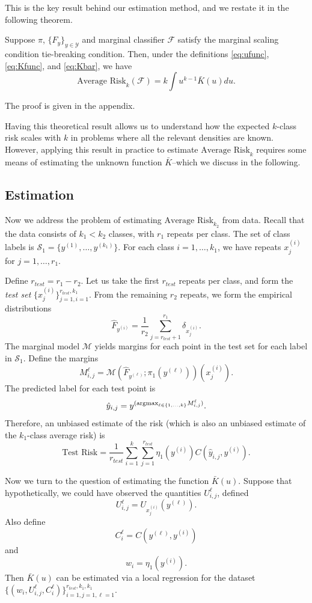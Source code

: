\documentclass[12pt]{article}
\begin{document}
This is the key result behind our estimation method, and we restate it
in the following theorem.

\begin{theorem}
Suppose $\pi$, $\{F_y\}_{y \in \mathcal{Y}}$ and marginal classifier
$\mathcal{F}$ satisfy the marginal scaling condition tie-breaking
condition.  Then, under the definitions \eqref{eq:ufunc}, \eqref{eq:Kfunc}, and \eqref{eq:Kbar}, we have
\[
\text{Average Risk}_k(\mathcal{F}) = k \int u^{k-1} \bar{K}(u) du.
\]
\end{theorem}

The proof is given in the appendix.

Having this theoretical result allows us to understand how the
expected $k$-class risk scales with $k$ in problems where all the
relevant densities are known.  However, applying this result in
practice to estimate $\text{Average Risk}_k$ requires some means of
estimating the unknown function $\bar{K}$--which we discuss in the
following.

\subsection{Estimation}

Now we address the problem of estimating $\text{Average Risk}_{k_2}$
from data.  Recall that the data consists of $k_1 < k_2$ classes, with
$r_1$ repeats per class.  The set of class labels is $\mathcal{S}_1 =
\{y^{(1)},\hdots, y^{(k_1)}\}$.  For each class $i = 1,\hdots, k_1$,
we have repeats $x_j^{(i)}$ for $j = 1,\hdots, r_1$.

Define $r_{test} = r_1 - r_2$.  Let us take the first $r_{test}$
repeats per class, and form the \emph{test set} $\{x_j^{(i)}\}_{j=1,
  i=1}^{r_{test}, k_1}$.  From the remaining $r_2$ repeats, we form the empirical distributions
\[
\hat{F}_{y^{(i)}} = \frac{1}{r_2}\sum_{j=r_{test} + 1}^{r_1} \delta_{x_j^{(i)}}.
\]
The marginal model $\mathcal{M}$ yields margins for each point in the
test set for each label in $\mathcal{S}_1$.  Define the margins
\[
M_{i, j}^\ell = \mathcal{M}(\hat{F}_{y^{(\ell)}}; \pi_1(y^{(\ell)}))(x_j^{(i)}).
\]
The predicted label for each test point is
\[
\hat{y}_{i,j} = y^{(\text{argmax}_{\ell \in \{1,\hdots, k\}} M_{i, j}^\ell)}.
\]
Therefore, an unbiased estimate of the risk (which is also an unbiased
estimate of the $k_1$-class average risk) is
\[
\text{Test Risk} = \frac{1}{r_{test}}\sum_{i=1}^k \sum_{j=1}^{r_{test}} \eta_1(y^{(i)}) C(\hat{y}_{i, j}, y^{(i)}).
\]

Now we turn to the question of estimating the function $\bar{K}(u)$.
Suppose that hypothetically, we could have observed the quantities
$U_{i, j}^\ell$, defined
\[
U_{i, j}^\ell = U_{x_j^{(i)}}(y^{(\ell)}).
\]
Also define
\[
C_i^\ell = C(y^{(\ell)}, y^{(i)})
\]
and
\[
w_i = \eta_1(y^{(i)}).
\]
Then $\bar{K}(u)$ can be estimated via a local regression for the
dataset $\{(w_i, U_{i,j}^\ell, C_i^\ell)\}_{i=1, j=1,
  \ell=1}^{r_{test}, k_1, k_1}$.
\end{document}

